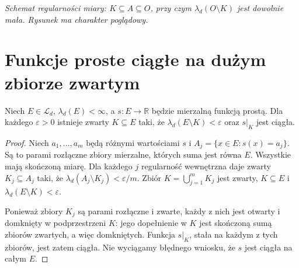 \begin{center}
\par\smallskip
\textit{Schemat regularności miary: $K\subseteq A\subseteq O$,
przy czym $\lambda_d(O\setminus K)$ jest dowolnie mała.
Rysunek ma charakter poglądowy.}
\end{center}

\section{Funkcje proste ciągłe na dużym zbiorze zwartym}

\begin{lemat}
\label{lem:lusin-simple-10}
Niech $E\in\mathcal L_d$, $\lambda_d(E)<\infty$,
a $s:E\to\mathbb R$ będzie mierzalną funkcją prostą.
Dla każdego $\varepsilon>0$ istnieje zwarty
$K\subseteq E$ taki, że
$\lambda_d(E\setminus K)<\varepsilon$ oraz
$s|_K$ jest ciągła.
\end{lemat}
\begin{proof}
Niech $a_1,\dots,a_m$ będą różnymi wartościami $s$
i $A_j=\{x\in E:s(x)=a_j\}$.
Są to parami rozłączne zbiory mierzalne, których
suma jest równa $E$. Wszystkie mają skończoną miarę.
Dla każdego $j$ regularność wewnętrzna daje
zwarty $K_j\subseteq A_j$ taki, że
$\lambda_d(A_j\setminus K_j)<\varepsilon/m$.
Zbiór $K=\bigcup_{j=1}^mK_j$ jest zwarty,
$K\subseteq E$ i
$\lambda_d(E\setminus K)<\varepsilon$.

Ponieważ zbiory $K_j$ są parami rozłączne i zwarte,
każdy z nich jest otwarty i domknięty w podprzestrzeni
$K$: jego dopełnienie w $K$ jest skończoną sumą
zbiorów zwartych, a więc domkniętych.
Funkcja $s|_K$, stała na każdym z tych zbiorów,
jest zatem ciągła. Nie wyciągamy błędnego wniosku,
że $s$ jest ciągła na całym $E$.
\end{proof}

